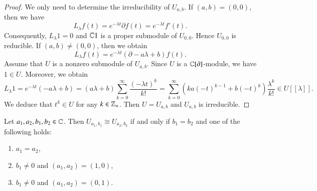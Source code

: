 \documentclass[12pt]{amsart}
\begin{document}
\begin{proof}
We only need to determine %
the irreducibility of $U_{a,b}$.
If $(a,b)=(0,0)$, then we have $$L_\lambda f(t)=e^{-\lambda t}\partial f(t)=e^{-\lambda t}f'(t).$$
Consequently, $L_\lambda 1=0$ and $\mathbb{C} 1$ is a proper submodule of $U_{0,0}$. Hence $U_{0,0}$ is reducible.
If $(a,b)\neq(0,0)$,  then we obtain $$L_\lambda f(t)=e^{-\lambda t}(\partial-a \lambda+b)f(t).$$
Assume that $U$ is a nonzero submodule of $U_{a,b}$.
Since $U$ is a $\mathbb{C}[\partial]$-module, we have $1\in U$.
Moreover, we obtain
$$L_\lambda 1=e^{-\lambda t}(-a \lambda+b)
=(a \lambda+b)\sum_{k=0}^\infty \frac{(-\lambda t)^k}{k!}
=\sum_{k=0}^\infty(ka(-t)^{k-1}+b(-t)^k)\frac{\lambda^k}{k!}\in U[[\lambda]].$$
We deduce that $t^k\in U$ for any $k\in\mathbb{Z}_+$. Then $U=U_{a,b}$ and $U_{a,b}$ is irreducible.
\end{proof}
\begin{pro}Let $a_1,a_2,b_1,b_2\in\mathbb{C}$. Then
$U_{a_1,b_1}\cong U_{a_2,b_2}$ if and only if $b_1=b_2$ and one of the following holds:
\begin{enumerate}
\item $a_1=a_2$,
\item $b_1\neq0$ and $(a_1,a_2)=(1,0)$,
\item $b_1\neq0$ and $(a_1,a_2)=(0,1)$.
\end{enumerate}
\end{pro}
\end{document}

